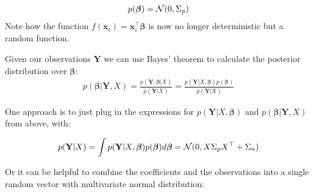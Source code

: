 \begin{gather*}
    p(\boldsymbol{\beta}) = \operatorname{\mathcal{N}}(0, \Sigma_p)
\end{gather*}
Note how the function $f(\mathbf{x}_i)=\mathbf{x}_i^{\top}\boldsymbol{\beta}$ is now no longer deterministic but a random function.

Given our observations $\mathbf{Y}$  we can use Bayes' theorem to calculate the posterior distribution over $\boldsymbol{\beta}$:
\begin{gather*}
    p(\boldsymbol{\beta}| \mathbf{Y}, X) = \frac{p(\mathbf{Y},\boldsymbol{\beta}|X)}{p(\mathbf{Y}|X)} =
    \frac{p(\mathbf{Y}|X,\boldsymbol{\beta})p(\boldsymbol{\beta})}{p(\mathbf{Y}|X)}
\end{gather*}

One approach is to just plug in the expressions for
$p(\mathbf{Y}|X,\boldsymbol{\beta})$ and $p(\boldsymbol{\beta}|\mathbf{Y}, X)$ from above, with:

\begin{gather*}
    p(\mathbf{Y}|X) = \int p(\mathbf{Y}|X,\boldsymbol{\beta}) p(\boldsymbol{\beta}) d\boldsymbol{\beta} = \operatorname{\mathcal{N}}(0, X \Sigma_p X^{\top} + \Sigma_n)
\end{gather*}

Or it can be helpful to combine the coefficients and the observations into a single random vector with
multivariate normal distribution:


